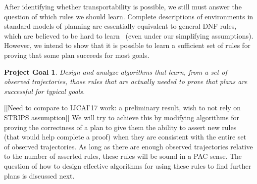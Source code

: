 \documentclass[12pt]{article}
\newcommand{\note}[1]{\textbf{\textit{#1}}}
\newtheorem{problem}{Project Goal}
\begin{document}
After identifying whether transportability is possible, we still must answer the question of which rules we should  learn. Complete descriptions of environments in standard models of planning are essentially equivalent to general DNF rules, which are believed to be hard to learn~\cite{daniely2016dnf} (even under our simplifying assumptions). However, we intend to show that it is possible to learn a sufficient set of rules for proving that some plan succeeds for most goals.
\begin{problem}
Design and analyze algorithms that learn, from a set of observed trajectories, those rules that are actually needed to prove that plans are successful for typical goals.
\end{problem}
[[Need to compare to IJCAI'17 work: a preliminary result, wish to not rely on STRIPS assumption]]
We will try to achieve this by modifying algorithms for proving the correctness of a plan to give them the ability to assert new rules (that would help complete a proof) when they are consistent with the entire set of observed trajectories. As long as there are enough observed trajectories relative to the number of asserted rules, these rules will be sound in a PAC sense. The question of how to design effective algorithms for using these rules to find further plans is discussed next.
\end{document}
